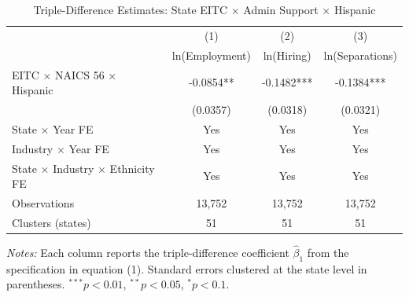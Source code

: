 \begin{table}[htbp]
\centering
\caption{Triple-Difference Estimates: State EITC $\times$ Admin Support $\times$ Hispanic}
\label{tab:main}
\begin{tabular}{lccc}
\hline\hline
 & (1) & (2) & (3) \\
 & ln(Employment) & ln(Hiring) & ln(Separations) \\
\hline
EITC $\times$ NAICS 56 $\times$ Hispanic & -0.0854** & -0.1482*** & -0.1384*** \\
 & (0.0357) & (0.0318) & (0.0321) \\
\hline
State $\times$ Year FE & Yes & Yes & Yes \\
Industry $\times$ Year FE & Yes & Yes & Yes \\
State $\times$ Industry $\times$ Ethnicity FE & Yes & Yes & Yes \\
Observations & 13,752 & 13,752 & 13,752 \\
Clusters (states) & 51 & 51 & 51 \\
\hline\hline
\end{tabular}
\begin{tablenotes}[flushleft]
\small
\item \textit{Notes:} Each column reports the triple-difference coefficient $\hat{\beta}_1$ from the specification in equation (1). Standard errors clustered at the state level in parentheses. $^{***}p<0.01$, $^{**}p<0.05$, $^{*}p<0.1$.
\end{tablenotes}
\end{table}
